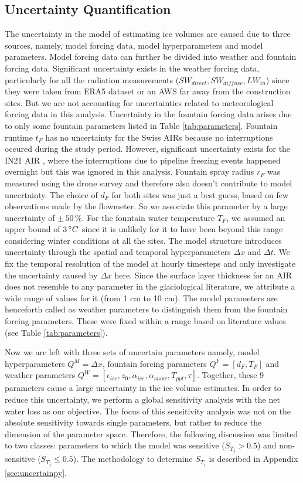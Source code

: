 \documentclass[utf8]{frontiersSCNS}
\begin{document}
\subsection{Uncertainty Quantification}

The uncertainty in the model of estimating ice volumes are caused due to three sources, namely, model forcing
data, model hyperparameters and model parameters. Model forcing data can further be divided into weather and
fountain forcing data. Significant uncertainty exists in the weather forcing data, particularly for all the
radiation measurements ($SW_{direct}, SW_{diffuse}, LW_{in}$) since they were taken from ERA5 dataset or an AWS
far away from the construction sites. But we are not accounting for uncertainties related to meteorological
forcing data in this analysis. Uncertainty in the fountain forcing data arises due to only some fountain
parameters listed in Table \ref{tab:parameters}. Fountain runtime $t_F$ has no uncertainty for the Swiss AIRs
because no interruptions occured during the study period. However, significant uncertainty exists for the IN21
AIR , where the interruptions due to pipeline freezing events happened overnight but this was ignored in this
analysis. Fountain spray radius $r_F$ was measured using the drone survey and therefore also doesn't contribute
to model uncertainty. The choice of $d_F$ for both sites was just a best guess, based on few observations made
by the flowmeter. So we associate this parameter by a large uncertainty of $\pm \,50\, \%$. For the fountain
water temperature $T_F$, we assumed an upper bound of $3\, \degree C$ since it is unlikely for it to have been
beyond this range considering winter conditions at all the sites. The model structure introduces uncertainty
through the spatial and temporal hyperparameters $\Delta x$ and $\Delta t$. We fix the temporal resolution of
the model at hourly timesteps and only investigate the uncertainty caused by $\Delta x$ here. Since the surface
layer thickness for an AIR does not resemble to any parameter in the glaciological literature, we attribute a
wide range of values for it (from 1 cm to 10 cm). The model parameters are henceforth called as weather parameters to distinguish
them from the fountain forcing parameters. These were fixed within a range based on literature values (see Table
\ref{tab:parameters}). 

Now we are left with three sets of uncertain parameters namely, model hyperparameters $Q^M = \Delta x$, fountain
forcing parameters $Q^F = [d_F, T_F]$ and weather parameters $Q^W = [\epsilon_{ice}, z_0, \alpha_{ice},
\alpha_{snow}, T_{ppt}, \tau]$. Together, these 9 parameters cause a large uncertainty in the ice volume
estimates. In order to reduce this uncertainty, we perform a global sensitivity analysis with the net water loss
as our objective. The focus of this sensitivity analysis was not on the absolute sensitivity towards single
parameters, but rather to reduce the dimension of the parameter space. Therefore, the following discussion was
limited to two classes: parameters to which the model was sensitive ($S_{T_{j}} > 0.5$) and non-sensitive
($S_{T_{j}} \leq 0.5$). The methodology to determine $S_{T_{j}}$ is described in Appendix \ref{sec:uncertainpy}.
\end{document}
